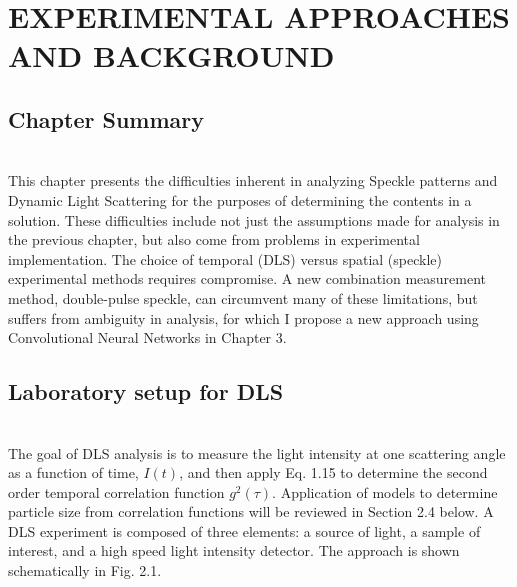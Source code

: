\chapter{EXPERIMENTAL APPROACHES AND BACKGROUND}

\section{Chapter Summary} \\

This chapter presents the difficulties inherent in analyzing Speckle patterns and Dynamic Light Scattering for the purposes of determining the contents in a solution.  These difficulties include not just the assumptions made for analysis in the previous chapter, but also come from problems in experimental implementation.  The choice of temporal (DLS) versus spatial (speckle) experimental methods requires compromise.   A new combination measurement method, double-pulse speckle, can circumvent many of these limitations, but suffers from ambiguity in analysis, for which I propose a new approach using Convolutional Neural Networks in Chapter 3.

\vspace{10mm}

\section{Laboratory setup for DLS} \\

The goal of DLS analysis is to measure the light intensity at one scattering angle as a function of time, $I(t)$, and then apply Eq. 1.15 to determine the second order temporal correlation function $g^2(\tau)$.  Application of models to determine particle size from correlation functions will be reviewed in Section 2.4 below.  A DLS experiment is composed of three elements:  a source of light, a sample of interest, and a high speed light intensity detector.  The approach is shown schematically in Fig. 2.1. \\



